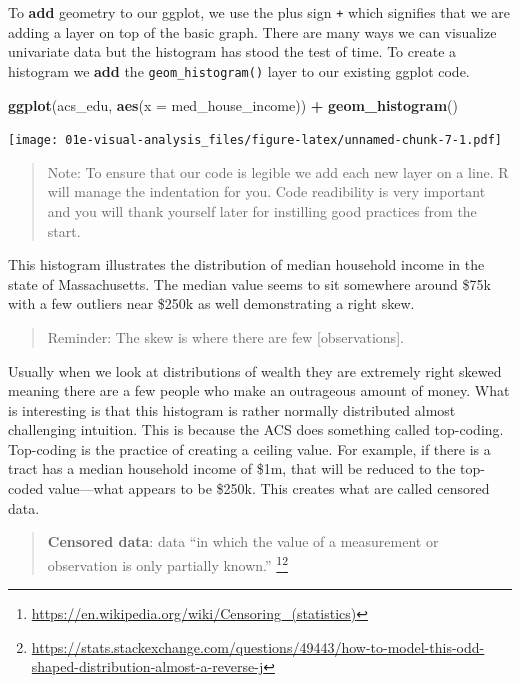 \documentclass[
]{book}
\newenvironment{Shaded}{\begin{snugshade}}{\end{snugshade}}
\newcommand{\DataTypeTok}[1]{\textcolor[rgb]{0.13,0.29,0.53}{#1}}
\newcommand{\KeywordTok}[1]{\textcolor[rgb]{0.13,0.29,0.53}{\textbf{#1}}}
\newcommand{\NormalTok}[1]{#1}
\newcommand{\OperatorTok}[1]{\textcolor[rgb]{0.81,0.36,0.00}{\textbf{#1}}}
\newcommand{\StringTok}[1]{\textcolor[rgb]{0.31,0.60,0.02}{#1}}
\begin{document}
To \textbf{add} geometry to our ggplot, we use the plus sign \texttt{+} which signifies that we are adding a layer on top of the basic graph. There are many ways we can visualize univariate data but the histogram has stood the test of time. To create a histogram we \textbf{add} the \texttt{geom\_histogram()} layer to our existing ggplot code.

\begin{Shaded}
\begin{Highlighting}[]
\KeywordTok{ggplot}\NormalTok{(acs\_edu, }\KeywordTok{aes}\NormalTok{(}\DataTypeTok{x =}\NormalTok{ med\_house\_income)) }\OperatorTok{+}\StringTok{ }
\StringTok{  }\KeywordTok{geom\_histogram}\NormalTok{()}
\end{Highlighting}
\end{Shaded}

\texttt{[image: 01e-visual-analysis\_files/figure-latex/unnamed-chunk-7-1.pdf]}

\begin{quote}
Note: To ensure that our code is legible we add each new layer on a line. R will manage the indentation for you. Code readibility is very important and you will thank yourself later for instilling good practices from the start.
\end{quote}

This histogram illustrates the distribution of median household income in the state of Massachusetts. The median value seems to sit somewhere around \$75k with a few outliers near \$250k as well demonstrating a right skew.

\begin{quote}
Reminder: The skew is where there are few {[}observations{]}.
\end{quote}

Usually when we look at distributions of wealth they are extremely right skewed meaning there are a few people who make an outrageous amount of money. What is interesting is that this histogram is rather normally distributed almost challenging intuition. This is because the ACS does something called top-coding. Top-coding is the practice of creating a ceiling value. For example, if there is a tract has a median household income of \$1m, that will be reduced to the top-coded value---what appears to be \$250k. This creates what are called censored data.

\begin{quote}
\textbf{Censored data}: data ``in which the value of a measurement or observation is only partially known.'' \footnote{\url{https://en.wikipedia.org/wiki/Censoring_(statistics)}}\footnote{\url{https://stats.stackexchange.com/questions/49443/how-to-model-this-odd-shaped-distribution-almost-a-reverse-j}}
\end{quote}
\end{document}
